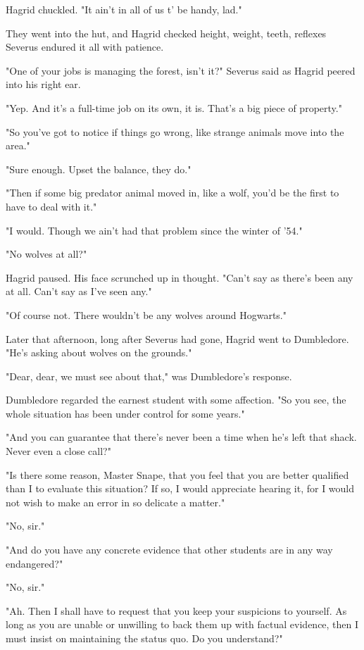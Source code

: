 Hagrid chuckled. "It ain't in all of us t' be handy, lad."

They went into the hut, and Hagrid checked height, weight, teeth, reflexes{\el} Severus endured it all with patience.

"One of your jobs is managing the forest, isn't it?" Severus said as Hagrid peered into his right ear.

"Yep. And it's a full-time job on its own, it is. That's a big piece of property."

"So you've got to notice if things go wrong, like strange animals move into the area."

"Sure enough. Upset the balance, they do."

"Then if some big predator animal moved in, like a wolf, you'd be the first to have to deal with it."

"I would. Though we ain't had that problem since the winter of '54."

"No wolves at all?"

Hagrid paused. His face scrunched up in thought. "Can't say as there's been any at all. Can't say as I've seen any."

"Of course not. There wouldn't be any wolves around Hogwarts."

Later that afternoon, long after Severus had gone, Hagrid went to Dumbledore. "He's asking about wolves on the grounds."

"Dear, dear, we must see about that," was Dumbledore's response.

Dumbledore regarded the earnest student with some affection. "So you see, the whole situation has been under control for some years."

"And you can guarantee that there's never been a time when he's left that shack. Never even a close call?"

"Is there some reason, Master Snape, that you feel that you are better qualified than I to evaluate this situation? If so, I would appreciate hearing it, for I would not wish to make an error in so delicate a matter."

"No, sir."

"And do you have any concrete evidence that other students are in any way endangered?"

"No, sir."

"Ah. Then I shall have to request that you keep your suspicions to yourself. As long as you are unable or unwilling to back them up with factual evidence, then I must insist on maintaining the status quo. Do you understand?"

